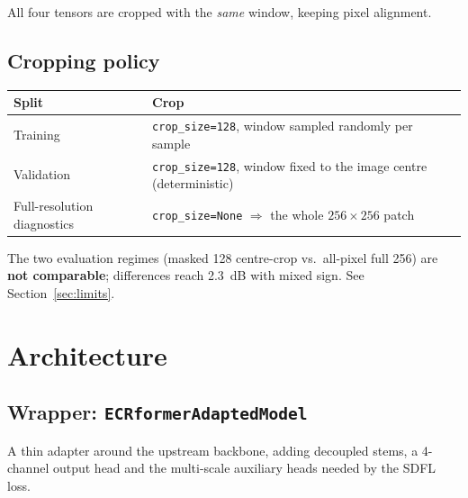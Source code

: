 \documentclass[10pt,a4paper]{article}
\newcommand{\code}[1]{\texttt{#1}}
\begin{document}
All four tensors are cropped with the \emph{same} window, keeping pixel alignment.

\subsection{Cropping policy}

\begin{center}
\begin{tabular}{@{}ll@{}}
\hline
Split & Crop \\
\hline
Training & \code{crop\_size=128}, window sampled randomly per sample \\
Validation & \code{crop\_size=128}, window fixed to the image centre (deterministic) \\
Full-resolution diagnostics & \code{crop\_size=None} $\Rightarrow$ the whole $256\times256$ patch \\
\hline
\end{tabular}
\end{center}

The two evaluation regimes (masked 128 centre-crop vs.\ all-pixel full 256) are \textbf{not
comparable}; differences reach 2.3~dB with mixed sign. See Section~\ref{sec:limits}.

\section{Architecture}

\subsection{Wrapper: \code{ECRformerAdaptedModel}}

A thin adapter around the upstream backbone, adding decoupled stems, a 4-channel output head and
the multi-scale auxiliary heads needed by the SDFL loss.
\end{document}
